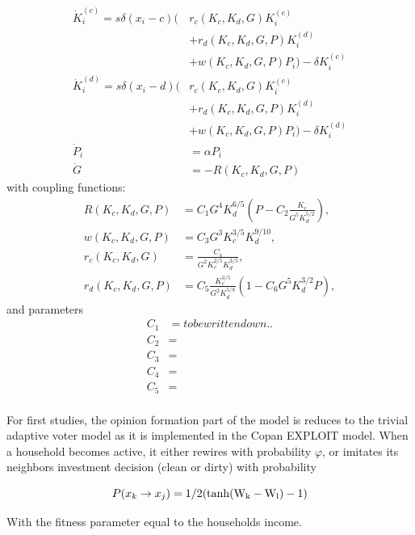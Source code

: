 \begin{align}
	\dot{K}_i^{(c)} = s \delta(x_i - c) \bigg(&  r_c(K_c, K_d, G)  K_i^{(c)} \nonumber \\
	&+ r_d(K_c, K_d, G, P) K_i^{(d)} \nonumber \\ 
	&+w(K_c, K_d, G, P)  P_i \bigg) - \delta K_i^{(c)} \\
	\dot{K}_i^{(d)} = s \delta(x_i - d) \bigg(&  r_c(K_c, K_d, G)  K_i^{(c)} \nonumber \\
	&+ r_d(K_c, K_d, G, P) K_i^{(d)} \nonumber \\ 
	&+  w(K_c, K_d, G, P) P_i \bigg) - \delta K_i^{(d)} \\
	\dot{P}_i &= \alpha P_i \nonumber \\
	\dot{G} &= - R(K_c, K_d, G, P) 
\end{align}
with coupling functions:
\begin{align}
	R(K_c, K_d, G, P) &= C_1G^4 K_d^{6/5}\left( P - C_2 \frac{K_c}{G^5K_d^{5/2}} \right), \\
	w(K_c, K_d, G, P) &= C_3 G^3 K_c^{3/5}K_d^{9/10} , \\
	r_c(K_c, K_d, G) \quad &= \frac{C_4}{G^2 K_c^{2/5}K_d^{3/5}} , \\
	r_d(K_c, K_d, G, P) &= C_5 \frac{K_c^{3/5}}{G^2 K_d^{5/8}} \left( 1-C_6 G^5 K_d^{3/2} P \right) ,
	\label{final_rates_and_wages}
\end{align}
and parameters
\begin{align}
	C_1 &= to be written down..\nonumber \\
	C_2 &= \nonumber \\
	C_3 &= \nonumber \\
	C_4 &= \nonumber \\
	C_5 &= \nonumber \\
\end{align}

For first studies, the opinion formation part of the model is reduces to the trivial adaptive voter model as it is implemented in the Copan EXPLOIT model. When a household becomes active, it either rewires with probability $\varphi$, or imitates its neighbors investment decision (clean or dirty) with probability 

\begin{equation}
	P(x_k \rightarrow x_j) = 1/2 (\rm{tanh}(W_k - W_l)-1)
	\label{primitive_imitation_probability}
\end{equation}

With the fitness parameter equal to the households income.

{}
    
